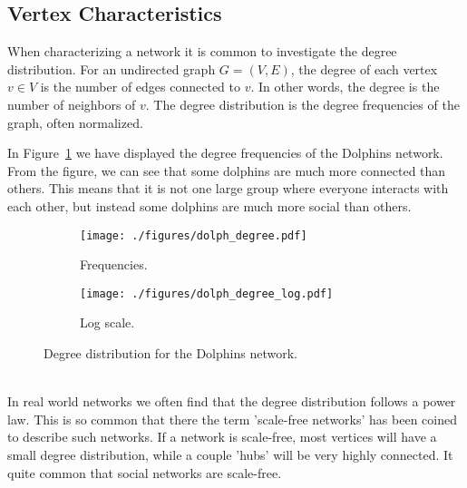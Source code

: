 \documentclass[11pt,a4paper]{article}
\begin{document}
\subsection{Vertex Characteristics}
\label{Vertex Characteristics}
When characterizing a network it is common to investigate the degree distribution.
For an undirected graph $G = (V, E)$, the degree of each vertex $v \in V$ is the number of edges connected to $v$. In other words, the degree is the number of neighbors of $v$. The degree distribution is the degree frequencies of the graph, often normalized. 

In Figure~\ref{fig:dolph_degree} we have displayed the degree frequencies of the Dolphins network. From the figure, we can see that some dolphins are much more connected than others. This means that it is not one large group where everyone interacts with each other, but instead some dolphins are much more social than others.
\\
\begin{figure}[h!tbp]
    \centering
    \begin{subfigure}[b]{0.48\textwidth}
        \texttt{[image: ./figures/dolph\_degree.pdf]}
        \caption{Frequencies.}
        \label{fig:dolph_degree}
    \end{subfigure}%
    \quad
    \begin{subfigure}[b]{0.48\textwidth}
        \texttt{[image: ./figures/dolph\_degree\_log.pdf]}
        \caption{Log scale.}
        \label{fig:dolph_degree_log}
    \end{subfigure}
    \vspace{1\baselineskip}
    \caption{Degree distribution for the Dolphins network.}
    \label{fig:dolph_degree_all}
\end{figure}
%
\\
In real world networks we often find that the degree distribution follows a power law. This is so common that there the term 'scale-free networks' has been coined to describe such networks. If a network is scale-free, most vertices will have a small degree distribution, while a couple 'hubs' will be very highly connected. It quite common that social networks are scale-free.
\end{document}
